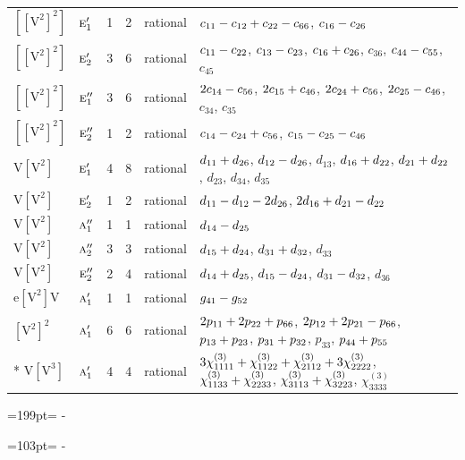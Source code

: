 \documentclass[10pt,a4paper]{article}
\newcommand{\needspace}[1]{\par\penalty-100\begingroup\dimen0=#1\relax\dimen2=\pagegoal
  \advance\dimen2-\pagetotal\ifdim\dimen0>\dimen2\relax\ifdim\dimen2>0pt\vfil\break\fi\fi
  \endgroup}
\numberwithin{equation}{section}
\newcommand{\irr}[1]{\text{\normalfont\scshape #1}}
\newcommand{\jahn}[1]{\mathrm{#1}}
\newlength{\fillwidth}\newlength{\cellwidth}\newlength{\colwidth}
\newcommand{\signbreak}{\penalty100\relax}
\begin{document}
{\begin{longtable}{@{}llrrl>{\RaggedRight\arraybackslash}p{\fillwidth}@{}}
$\jahn{[[V^{2}]^{2}]}$ & $\irr{e}_{1}'$ & 1 & 2 & rational & $c_{11} -\signbreak c_{12} +\signbreak c_{22} -\signbreak c_{66}$, $c_{16} -\signbreak c_{26}$\\
$\jahn{[[V^{2}]^{2}]}$ & $\irr{e}_{2}'$ & 3 & 6 & rational & $c_{11} -\signbreak c_{22}$, $c_{13} -\signbreak c_{23}$, $c_{16} +\signbreak c_{26}$, $c_{36}$, $c_{44} -\signbreak c_{55}$, $c_{45}$\\
$\jahn{[[V^{2}]^{2}]}$ & $\irr{e}_{1}''$ & 3 & 6 & rational & $2c_{14} -\signbreak c_{56}$, $2c_{15} +\signbreak c_{46}$, $2c_{24} +\signbreak c_{56}$, $2c_{25} -\signbreak c_{46}$, $c_{34}$, $c_{35}$\\
$\jahn{[[V^{2}]^{2}]}$ & $\irr{e}_{2}''$ & 1 & 2 & rational & $c_{14} -\signbreak c_{24} +\signbreak c_{56}$, $c_{15} -\signbreak c_{25} -\signbreak c_{46}$\\
$\jahn{V[V^{2}]}$ & $\irr{e}_{1}'$ & 4 & 8 & rational & $d_{11} +\signbreak d_{26}$, $d_{12} -\signbreak d_{26}$, $d_{13}$, $d_{16} +\signbreak d_{22}$, $d_{21} +\signbreak d_{22}$, $d_{23}$, $d_{34}$, $d_{35}$\\
$\jahn{V[V^{2}]}$ & $\irr{e}_{2}'$ & 1 & 2 & rational & $d_{11} -\signbreak d_{12} -\signbreak 2d_{26}$, $2d_{16} +\signbreak d_{21} -\signbreak d_{22}$\\
$\jahn{V[V^{2}]}$ & $\irr{a}_{1}''$ & 1 & 1 & rational & $d_{14} -\signbreak d_{25}$\\
$\jahn{V[V^{2}]}$ & $\irr{a}_{2}''$ & 3 & 3 & rational & $d_{15} +\signbreak d_{24}$, $d_{31} +\signbreak d_{32}$, $d_{33}$\\
$\jahn{V[V^{2}]}$ & $\irr{e}_{2}''$ & 2 & 4 & rational & $d_{14} +\signbreak d_{25}$, $d_{15} -\signbreak d_{24}$, $d_{31} -\signbreak d_{32}$, $d_{36}$\\
$\jahn{e[V^{2}]V}$ & $\irr{a}_{1}'$ & 1 & 1 & rational & $\mathnormal{g}_{41} -\signbreak \mathnormal{g}_{52}$\\
$\jahn{[V^{2}]^{2}}$ & $\irr{a}_{1}'$ & 6 & 6 & rational & $2p_{11} +\signbreak 2p_{22} +\signbreak p_{66}$, $2p_{12} +\signbreak 2p_{21} -\signbreak p_{66}$, $p_{13} +\signbreak p_{23}$, $p_{31} +\signbreak p_{32}$, $p_{33}$, $p_{44} +\signbreak p_{55}$\\*
$\jahn{V[V^{3}]}$ & $\irr{a}_{1}'$ & 4 & 4 & rational & $3\chi^{(3)}_{1111} +\signbreak \chi^{(3)}_{1122} +\signbreak \chi^{(3)}_{2112} +\signbreak 3\chi^{(3)}_{2222}$, $\chi^{(3)}_{1133} +\signbreak \chi^{(3)}_{2233}$, $\chi^{(3)}_{3113} +\signbreak \chi^{(3)}_{3223}$, $\chi^{(3)}_{3333}$\\
\bottomrule\end{longtable}}
\needspace{199pt}
\needspace{103pt}
\end{document}
